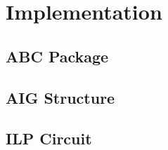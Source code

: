 \section{Implementation}
\subsection{ABC Package}
\subsection{AIG Structure}
\subsection{ILP Circuit}
